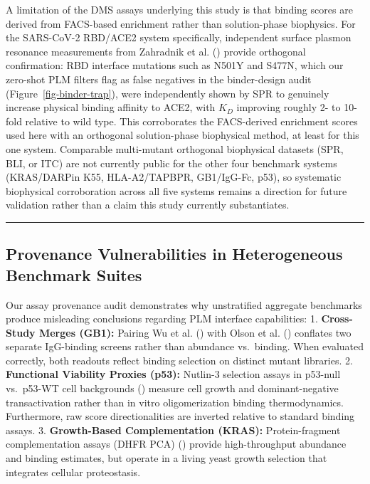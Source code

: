 \documentclass[
  11pt,
  us-letterpaper,
  DIV=11,
  numbers=noendperiod]{scrartcl}
\begin{document}
A limitation of the DMS assays underlying this study is that binding
scores are derived from FACS-based enrichment rather than solution-phase
biophysics. For the SARS-CoV-2 RBD/ACE2 system specifically, independent
surface plasmon resonance measurements from Zahradnik et al.
() provide
orthogonal confirmation: RBD interface mutations such as N501Y and
S477N, which our zero-shot PLM filters flag as false negatives in the
binder-design audit (Figure~\ref{fig-binder-trap}), were independently
shown by SPR to genuinely increase physical binding affinity to ACE2,
with \(K_D\) improving roughly 2- to 10-fold relative to wild type. This
corroborates the FACS-derived enrichment scores used here with an
orthogonal solution-phase biophysical method, at least for this one
system. Comparable multi-mutant orthogonal biophysical datasets (SPR,
BLI, or ITC) are not currently public for the other four benchmark
systems (KRAS/DARPin K55, HLA-A2/TAPBPR, GB1/IgG-Fc, p53), so systematic
biophysical corroboration across all five systems remains a direction
for future validation rather than a claim this study currently
substantiates.

\begin{center}\rule{0.5\linewidth}{0.5pt}\end{center}

\subsection{Provenance Vulnerabilities in Heterogeneous Benchmark
Suites}\label{provenance-vulnerabilities-in-heterogeneous-benchmark-suites}

Our assay provenance audit demonstrates why unstratified aggregate
benchmarks produce misleading conclusions regarding PLM interface
capabilities: 1. \textbf{Cross-Study Merges (GB1):} Pairing Wu et al.
() with Olson et al.
() conflates two separate
IgG-binding screens rather than abundance vs.~binding. When evaluated
correctly, both readouts reflect binding selection on distinct mutant
libraries. 2. \textbf{Functional Viability Proxies (p53):} Nutlin-3
selection assays in p53-null vs.~p53-WT cell backgrounds
()
measure cell growth and dominant-negative transactivation rather than in
vitro oligomerization binding thermodynamics. Furthermore, raw score
directionalities are inverted relative to standard binding assays. 3.
\textbf{Growth-Based Complementation (KRAS):} Protein-fragment
complementation assays (DHFR PCA) () provide high-throughput abundance and binding estimates, but
operate in a living yeast growth selection that integrates cellular
proteostasis.
\end{document}
